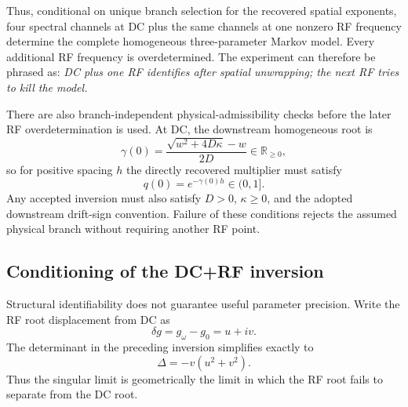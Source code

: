 \documentclass[11pt]{article}
\begin{document}
Thus, conditional on unique branch selection for the recovered spatial exponents, four spectral channels at DC plus the same channels at one nonzero RF frequency determine the complete homogeneous three-parameter Markov model. Every additional RF frequency is overdetermined. The experiment can therefore be phrased as: \emph{DC plus one RF identifies after spatial unwrapping; the next RF tries to kill the model.}

There are also branch-independent physical-admissibility checks before the later RF overdetermination is used. At DC, the downstream homogeneous root is
\begin{equation}
\gamma(0)=\frac{\sqrt{w^2+4D\kappa}-w}{2D}\in\mathbb R_{\ge0},
\end{equation}
so for positive spacing $h$ the directly recovered multiplier must satisfy
\begin{equation}
\boxed{q(0)=e^{-\gamma(0)h}\in(0,1].}
\label{eq:dc_multiplier_admissibility}
\end{equation}
Any accepted inversion must also satisfy $D>0$, $\kappa\ge0$, and the adopted downstream drift-sign convention. Failure of these conditions rejects the assumed physical branch without requiring another RF point.

\subsection{Conditioning of the DC+RF inversion}

Structural identifiability does not guarantee useful parameter precision. Write the RF root displacement from DC as
\begin{equation}
\delta g=g_\omega-g_0=u+iv.
\end{equation}
The determinant in the preceding inversion simplifies exactly to
\begin{equation}
\boxed{\Delta=-v(u^2+v^2).}
\label{eq:delta_geometry}
\end{equation}
Thus the singular limit is geometrically the limit in which the RF root fails to separate from the DC root.
\end{document}
